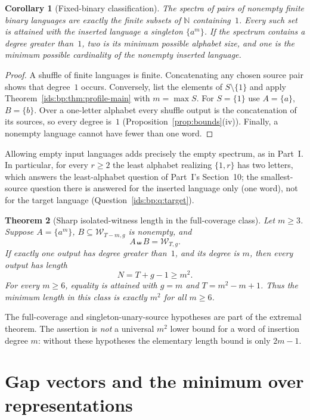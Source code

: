 \documentclass[11pt,letterpaper]{article}
\newtheorem{theorem}{Theorem}[section]
\newtheorem{corollary}[theorem]{Corollary}
\theoremstyle{definition}\newtheorem{definition}[theorem]{Definition}
\theoremstyle{remark}\newtheorem{remark}[theorem]{Remark}
\theoremstyle{definition}\newtheorem{question}[theorem]{Question}
\newcommand{\N}{\mathbb N}
\newcommand{\sh}{\mathbin{\shuffle}}
\newcommand{\bpW}[2]{\mathcal W_{#1,#2}}
\begin{document}
\begin{corollary}[Fixed-binary classification]
\label{ids:bp:cor:classification}
The spectra of pairs of nonempty finite binary languages are exactly the
finite subsets of $\N$ containing~$1$. Every such set is attained with the
inserted language a singleton $\{a^m\}$. If the spectrum contains a degree
greater than~$1$, two is its minimum possible alphabet size, and one is the
minimum possible cardinality of the nonempty inserted language.
\end{corollary}
\begin{proof}
A shuffle of finite languages is finite. Concatenating any chosen source pair
shows that degree~$1$ occurs. Conversely, list the elements of
$S\setminus\{1\}$ and apply Theorem~\ref{ids:bp:thm:profile-main} with
$m=\max S$. For $S=\{1\}$ use $A=\{a\}$, $B=\{b\}$. Over a one-letter alphabet
every shuffle output is the concatenation of its sources, so every degree
is~$1$ (Proposition~\ref{prop:bounds}(iv)). Finally, a nonempty language
cannot have fewer than one word.
\end{proof}
Allowing empty input languages adds precisely the empty spectrum, as in
Part~I. In particular, for every $r\geq2$ the least alphabet realizing
$\{1,r\}$ has two letters, which answers the least-alphabet question of
Part~I's Section~10; the smallest-source question there is answered for the
inserted language only (one word), not for the target language
(Question~\ref{ids:bp:q:target}).

\begin{theorem}[Sharp isolated-witness length in the full-coverage class]
\label{ids:bp:thm:length-main}
Let $m\geq3$. Suppose $A=\{a^m\}$, $B\subseteq\bpW{T-m}{g}$ is nonempty,
and
\[
 A\sh B=\bpW{T}{g}.
\]
If exactly one output has degree greater than~$1$, and its degree is $m$,
then every output has length
\begin{equation}
 N=T+g-1\geq m^2.
 \label{ids:bp:eq:sharp-main}
\end{equation}
For every $m\geq6$, equality is attained with $g=m$ and
$T=m^2-m+1$. Thus the minimum length in this class is exactly $m^2$ for
all $m\geq6$.
\end{theorem}

The full-coverage and singleton-unary-source hypotheses are part of the
extremal theorem. The assertion is \emph{not} a universal $m^2$ lower bound
for a word of insertion degree $m$: without these hypotheses the elementary
length bound is only $2m-1$.

\section{Gap vectors and the minimum over representations}
\label{ids:bp:sec:gaps}
\end{document}
